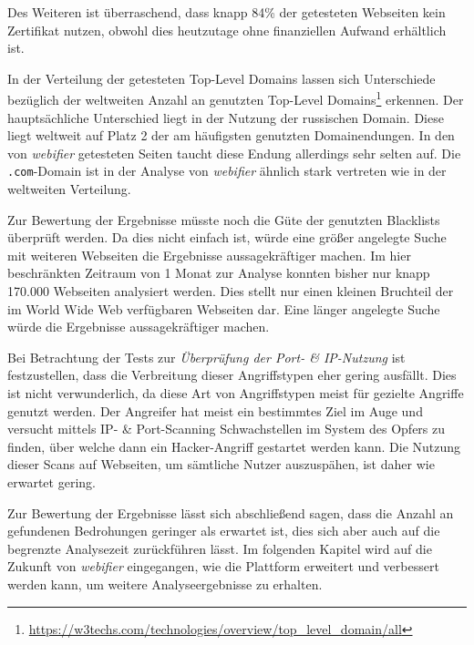 Des Weiteren ist überraschend, dass knapp 84\% der getesteten Webseiten kein Zertifikat nutzen, obwohl dies heutzutage ohne finanziellen Aufwand erhältlich ist.

In der Verteilung der getesteten Top-Level Domains lassen sich Unterschiede bezüglich der weltweiten
Anzahl an genutzten Top-Level
Domains\footnote{\url{https://w3techs.com/technologies/overview/top_level_domain/all}} erkennen. Der
hauptsächliche Unterschied liegt in der Nutzung der russischen Domain. Diese liegt weltweit auf Platz 2 der am häufigsten genutzten Domainendungen. In den von \textit{webifier} getesteten Seiten taucht diese Endung allerdings sehr selten auf. Die \lstinline[style=eclipse]{.com}-Domain ist in der Analyse von \textit{webifier} ähnlich stark vertreten wie in der weltweiten Verteilung.

Zur Bewertung der Ergebnisse müsste noch die Güte der genutzten Blacklists überprüft werden. Da dies nicht einfach ist, würde eine größer angelegte Suche mit weiteren Webseiten die Ergebnisse aussagekräftiger machen. Im hier beschränkten Zeitraum von 1 Monat zur Analyse konnten bisher nur knapp 170.000 Webseiten analysiert werden. Dies stellt nur einen kleinen Bruchteil der im World Wide Web verfügbaren Webseiten dar. Eine länger angelegte Suche würde die Ergebnisse aussagekräftiger machen.

Bei Betrachtung der Tests zur \textit{Überprüfung der Port- \& IP-Nutzung} ist festzustellen, dass die Verbreitung dieser Angriffstypen eher gering ausfällt. Dies ist nicht verwunderlich, da diese Art von Angriffstypen meist für gezielte Angriffe genutzt werden. Der Angreifer hat meist ein bestimmtes Ziel im Auge und versucht mittels IP- \& Port-Scanning Schwachstellen im System des Opfers zu finden, über welche dann ein Hacker-Angriff gestartet werden kann. Die Nutzung dieser Scans auf Webseiten, um sämtliche Nutzer auszuspähen, ist daher wie erwartet gering.

Zur Bewertung der Ergebnisse lässt sich abschließend sagen, dass die Anzahl an gefundenen Bedrohungen geringer als erwartet ist, dies sich aber auch auf die begrenzte Analysezeit zurückführen lässt. Im folgenden Kapitel wird auf die Zukunft von \textit{webifier} eingegangen, wie die Plattform erweitert und verbessert werden kann, um weitere Analyseergebnisse zu erhalten.
